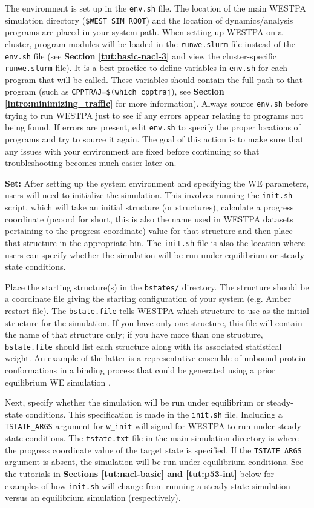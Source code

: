 The environment is set up in the \verb|env.sh| file. 
The location of the main WESTPA simulation directory (\verb|$WEST_SIM_ROOT|) and the location of dynamics/analysis programs are placed in your system path. 
When setting up WESTPA on a cluster, program modules will be loaded in the \verb|runwe.slurm| file instead of the \verb|env.sh| file (see \textbf{Section \ref{tut:basic-nacl-3}} and view the cluster-specific \verb|runwe.slurm| file). 
It is a best practice to define variables in \verb|env.sh| for each program that will be called. 
These variables should contain the full path to that program (such as \verb|CPPTRAJ=$(which cpptraj|), see \textbf{Section \ref{intro:minimizing_traffic}} for more information). 
Always source \verb|env.sh| before trying to run WESTPA just to see if any errors appear relating to programs not being found. 
If errors are present, edit \verb|env.sh| to specify the proper locations of programs and try to source it again. 
The goal of this action is to make sure that any issues with your environment are fixed before continuing so that troubleshooting becomes much easier later on. 

\textbf{Set:} After setting up the system environment and specifying the WE parameters, users will need to initialize the simulation. 
This involves running the \verb|init.sh| script, which will take an initial structure (or structures), calculate a progress coordinate (pcoord for short, this is also the name used in WESTPA datasets pertaining to the progress coordinate) value for that structure and then place that structure in the appropriate bin. 
The \verb|init.sh| file is also the location where users can specify whether the simulation will be run under equilibrium or steady-state conditions. 

Place the starting structure(s) in the \verb|bstates/| directory. 
The structure should be a coordinate file giving the starting configuration of your system (e.g. Amber restart file). 
The \verb|bstate.file| tells WESTPA which structure to use as the initial structure for the simulation. 
If you have only one structure, this file will contain the name of that structure only; if you have more than one structure, \verb|bstate.file| should list each structure along with its associated statistical weight. 
An example of the latter is a representative ensemble of unbound protein conformations in a binding process that could be generated using a prior equilibrium WE simulation \citep{Zwier2016,Saglam2019}. 

Next, specify whether the simulation will be run under equilibrium or steady-state conditions. 
This specification is made in the \verb|init.sh| file. 
Including a \verb|TSTATE_ARGS| argument for \verb|w_init| will signal for WESTPA to run under steady state conditions. 
The \verb|tstate.txt| file in the main simulation directory is where the progress coordinate value of the target state is specified. 
If the \verb|TSTATE_ARGS| argument is absent, the simulation will be run under equilibrium conditions. 
See the tutorials in \textbf{Sections \ref{tut:nacl-basic} and \ref{tut:p53-int}} below for examples of how \verb|init.sh| will change from running a steady-state simulation versus an equilibrium simulation (respectively).

